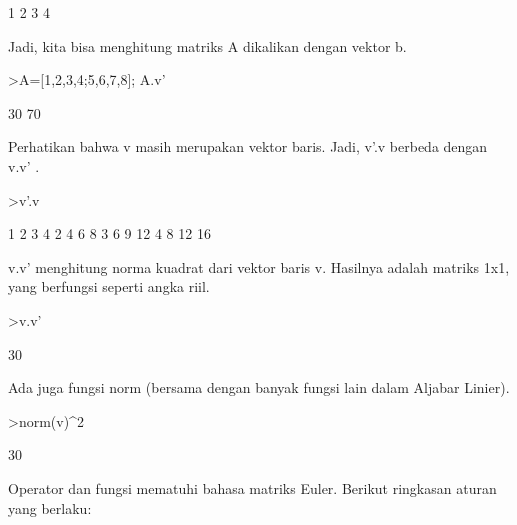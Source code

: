 \documentclass[a4paper,10pt]{article}
\begin{document}
\begin{eulernotebook}
\begin{eulercomment}
\begin{eulercomment}
\begin{eulercomment}
\begin{eulercomment}
\begin{eulercomment}
\begin{eulercomment}
\begin{eulercomment}
\begin{eulercomment}
\begin{eulercomment}
\begin{eulercomment}
\begin{eulercomment}
\begin{eulercomment}
\begin{eulercomment}
\begin{eulercomment}
\begin{eulercomment}
\begin{eulercomment}
\begin{eulercomment}
\begin{eulercomment}
\begin{eulercomment}
\begin{eulercomment}
\begin{euleroutput}
              1 
              2 
              3 
              4 
\end{euleroutput}
\begin{eulercomment}
Jadi, kita bisa menghitung matriks A dikalikan dengan vektor b.
\end{eulercomment}
\begin{eulerprompt}
>A=[1,2,3,4;5,6,7,8]; A.v'
\end{eulerprompt}
\begin{euleroutput}
             30 
             70 
\end{euleroutput}
\begin{eulercomment}
Perhatikan bahwa v masih merupakan vektor baris. Jadi, v'.v berbeda
dengan v.v' .
\end{eulercomment}
\begin{eulerprompt}
>v'.v
\end{eulerprompt}
\begin{euleroutput}
              1             2             3             4 
              2             4             6             8 
              3             6             9            12 
              4             8            12            16 
\end{euleroutput}
\begin{eulercomment}
v.v' menghitung norma kuadrat dari vektor baris v. Hasilnya adalah
matriks 1x1, yang berfungsi seperti angka riil.
\end{eulercomment}
\begin{eulerprompt}
>v.v'
\end{eulerprompt}
\begin{euleroutput}
  30
\end{euleroutput}
\begin{eulercomment}
Ada juga fungsi norm (bersama dengan banyak fungsi lain dalam Aljabar
Linier).
\end{eulercomment}
\begin{eulerprompt}
>norm(v)^2
\end{eulerprompt}
\begin{euleroutput}
  30
\end{euleroutput}
\begin{eulercomment}
Operator dan fungsi mematuhi bahasa matriks Euler. Berikut ringkasan
aturan yang berlaku:


\end{eulercomment}
\end{eulercomment}
\end{eulercomment}
\end{eulercomment}
\end{eulercomment}
\end{eulercomment}
\end{eulercomment}
\end{eulercomment}
\end{eulercomment}
\end{eulercomment}
\end{eulercomment}
\end{eulercomment}
\end{eulercomment}
\end{eulercomment}
\end{eulercomment}
\end{eulercomment}
\end{eulercomment}
\end{eulercomment}
\end{eulercomment}
\end{eulercomment}
\end{eulercomment}
\end{eulernotebook}
\end{document}
